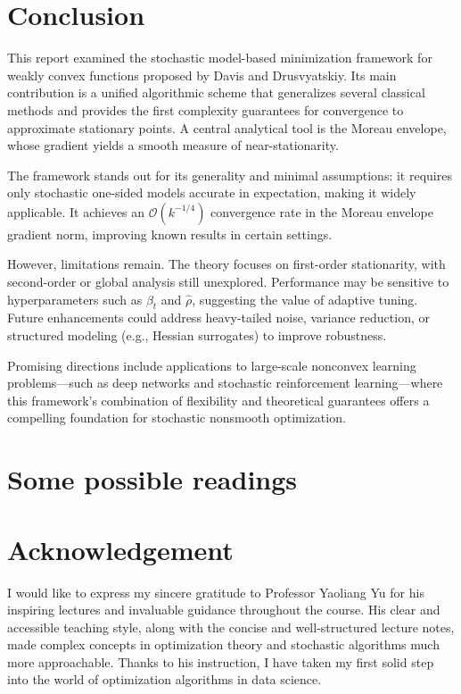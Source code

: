 \documentclass{article}
\begin{document}
 

\section{Conclusion}

This report examined the stochastic model-based minimization framework for weakly convex functions proposed by Davis and Drusvyatskiy. Its main contribution is a unified algorithmic scheme that generalizes several classical methods and provides the first complexity guarantees for convergence to approximate stationary points. A central analytical tool is the Moreau envelope, whose gradient yields a smooth measure of near-stationarity.

The framework stands out for its generality and minimal assumptions: it requires only stochastic one-sided models accurate in expectation, making it widely applicable. It achieves an $\mathcal{O}(k^{-1/4})$ convergence rate in the Moreau envelope gradient norm, improving known results in certain settings.

However, limitations remain. The theory focuses on first-order stationarity, with second-order or global analysis still unexplored. Performance may be sensitive to hyperparameters such as $\beta_t$ and $\hat{\rho}$, suggesting the value of adaptive tuning. Future enhancements could address heavy-tailed noise, variance reduction, or structured modeling (e.g., Hessian surrogates) to improve robustness.

Promising directions include applications to large-scale nonconvex learning problems—such as deep networks and stochastic reinforcement learning—where this framework's combination of flexibility and theoretical guarantees offers a compelling foundation for stochastic nonsmooth optimization.


\newpage
\section{Some possible readings}
\nocite{*}
\printbibliography[heading=none]
 
 
 
\newpage
\section*{Acknowledgement}

I would like to express my sincere gratitude to Professor Yaoliang Yu for his inspiring lectures and invaluable guidance throughout the course. His clear and accessible teaching style, along with the concise and well-structured lecture notes, made complex concepts in optimization theory and stochastic algorithms much more approachable. Thanks to his instruction, I have taken my first solid step into the world of optimization algorithms in data science.
\end{document}
